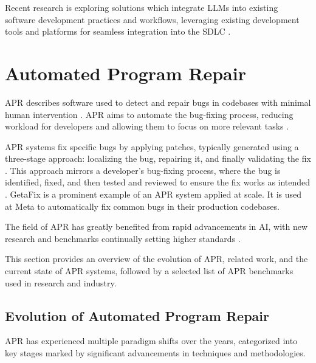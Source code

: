 Recent research is exploring solutions which integrate \acp{LLM} into existing software development practices and workflows, leveraging existing development tools and platforms for seamless integration into the \ac{SDLC} \cite{puvvadiCodingAgentsComprehensive2025, dohmkeGitHubCopilotMeet2025, IntroducingCodex, sauvolaFutureSoftwareDevelopment2024}.

\section{Automated Program Repair}

\ac{APR} describes software used to detect and repair bugs in codebases with minimal human intervention \cite{zhangSurveyLearningbasedAutomated2024}. APR aims to automate the bug-fixing process, reducing workload for developers and allowing them to focus on more relevant tasks \cite{houLargeLanguageModels2024}.

APR systems fix specific bugs by applying patches, typically generated using a three-stage approach: localizing the bug, repairing it, and finally validating the fix \cite{zhangSurveyLearningbasedAutomated2024, baderGetafixLearningFix2019}. This approach mirrors a developer's bug-fixing process, where the bug is identified, fixed, and then tested and reviewed to ensure the fix works as intended \cite{yangSWEagentAgentComputerInterfaces2024}. GetaFix is a prominent example of an APR system applied at scale. It is used at Meta to automatically fix common bugs in their production codebases. \cite{baderGetafixLearningFix2019}

The field of APR has greatly benefited from rapid advancements in \ac{AI}, with new research and benchmarks continually setting higher standards \cite{puvvadiCodingAgentsComprehensive2025, houLargeLanguageModels2024}.

This section provides an overview of the evolution of APR, related work, and the current state of APR systems, followed by a selected list of APR benchmarks used in research and industry.

\subsection{Evolution of Automated Program Repair} \label{subsection:evolution-apr}

\ac{APR} has experienced multiple paradigm shifts over the years, categorized into key stages marked by significant advancements in techniques and methodologies.

